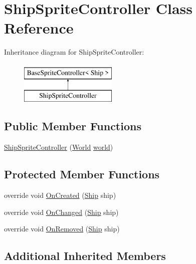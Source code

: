 \hypertarget{class_ship_sprite_controller}{}\section{Ship\+Sprite\+Controller Class Reference}
\label{class_ship_sprite_controller}
Inheritance diagram for Ship\+Sprite\+Controller\+:\begin{figure}[H]
\begin{center}
\leavevmode
\includegraphics[height=2.000000cm]{class_ship_sprite_controller}
\end{center}
\end{figure}
\subsection*{Public Member Functions}
\begin{DoxyCompactItemize}
\item 
\hyperlink{class_ship_sprite_controller_af965143d633c2693fa5cd64afba55dfb}{Ship\+Sprite\+Controller} (\hyperlink{class_world}{World} \hyperlink{class_base_sprite_controller_a593ea6a31165eff51a0acffc12ea65ca}{world})
\end{DoxyCompactItemize}
\subsection*{Protected Member Functions}
\begin{DoxyCompactItemize}
\item 
override void \hyperlink{class_ship_sprite_controller_a151f6e80970e4a2e5536f76978c546ca}{On\+Created} (\hyperlink{class_ship}{Ship} ship)
\item 
override void \hyperlink{class_ship_sprite_controller_a5216e1847d20829e57a5325c275b0b97}{On\+Changed} (\hyperlink{class_ship}{Ship} ship)
\item 
override void \hyperlink{class_ship_sprite_controller_ae094f3407c6c86e5ac29eb31b969c5c8}{On\+Removed} (\hyperlink{class_ship}{Ship} ship)
\end{DoxyCompactItemize}
\subsection*{Additional Inherited Members}


